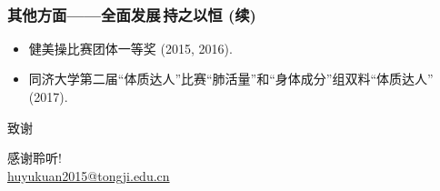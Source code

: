 \documentclass[10pt]{beamer}
\newcommand*{\songti}{\CJKfamily{song}}
\begin{document}
\begin{frame}
\begin{center}
\\
\footnotesize {}\end{center}
\end{frame}

\begin{frame}
\frametitle{其他方面——全面发展$\,$持之以恒 (续)}
{}
\begin{itemize}
\item 健美操比赛团体一等奖 (2015, 2016).
\item 同济大学第二届``体质达人''比赛``肺活量''和``身体成分''组双料``体质达人'' (2017).
\end{itemize}
\end{frame}

\begin{frame}{致谢}
\begin{center}
\huge \songti 感谢聆听!\\[0.3em]
\normalsize
\url{huyukuan2015@tongji.edu.cn}
\end{center}
\end{frame}
\end{document}
